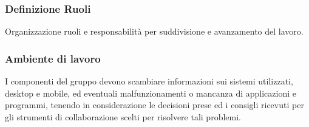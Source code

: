 \subsubsection{Definizione Ruoli}
Organizzazione ruoli e responsabilità per suddivisione e avanzamento del lavoro.

\subsubsection{Ambiente di lavoro}
I componenti del gruppo devono scambiare informazioni sui sistemi utilizzati, desktop e mobile, ed eventuali malfunzionamenti o mancanza di applicazioni e programmi, tenendo in considerazione le decisioni prese ed i consigli ricevuti per gli strumenti di collaborazione scelti per risolvere tali problemi.

\clearpage
